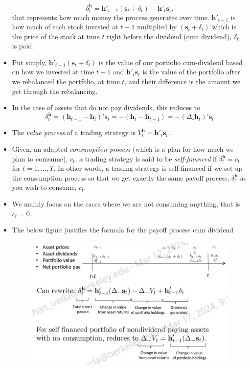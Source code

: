 \documentclass[11pt]{article}
\begin{document}
\begin{itemize}
    \[
    \delta_t^{\boldsymbol{h}} = \boldsymbol{h}'_{t-1}(\boldsymbol{s}_t + \delta_t) - 
    \boldsymbol{h}'_{t}\boldsymbol{s}_t.
    \]
    that represents how much money the process generates over time. $\boldsymbol{h}'_{t-1}$ is 
    how much of each stock invested at $t-1$ multiplied by $(\boldsymbol{s}_t + \delta_t)$ 
    which is the price of the stock at time $t$ right before the dividend (cum dividend), 
    $\delta_t$, is paid. 
    \item Put simply, $\boldsymbol{h}'_{t-1}(\boldsymbol{s}_t + \delta_t)$ is the value of our 
    portfolio cum-dividend based on how we invested at time $t-1$ and $\boldsymbol{h}'_{t}
    \boldsymbol{s}_t$ is the value of the portfolio after we rebalanced the portfolio, at time 
    $t$, and their difference is the amount we get through the rebalancing. 
    \item In the case of assets that do not pay dividends, this reduces to  
    \[
    \delta_t^{\boldsymbol{h}} = (\boldsymbol{h}_{t-1}-\boldsymbol{h}_{t})'\boldsymbol{s}_t
    = -(\boldsymbol{h}_{t} - \boldsymbol{h}_{t-1}) = -(\Delta \_\boldsymbol{h}_{t})'
    \boldsymbol{s}_t
    \]   
    \item The \textit{value process} of a trading strategy is $V_t^{\boldsymbol{h}} = 
    \boldsymbol{h}'_{t}\boldsymbol{s}_t$.
    \item Given, an adapted \textit{consumption process} (which is a plan for how much we plan 
    to comsume), $c_t$, a trading strategy is said to be \textit{self-financed} if 
    $\delta_t^{\boldsymbol{h}} = c_t$ for $t=1, \ldots, T$. In other words, a trading strategy 
    is self-financed if we set up the consumption process so that we get exactly the same 
    payoff process, $\delta_t^{\boldsymbol{h}}$ as you wish to consume, $c_t$. 
    \item We mainly focus on the cases where we are not consuming anything, that is $c_t=0$. 
    \item The below figure justifies the formula for the payoff process cum dividend
    \begin{figure}[H] 
        \centering 
        \includegraphics[width=5in]{imgs/payoff_process_cum_div_justified.jpeg}

\end{figure}
\end{itemize}
\end{document}
